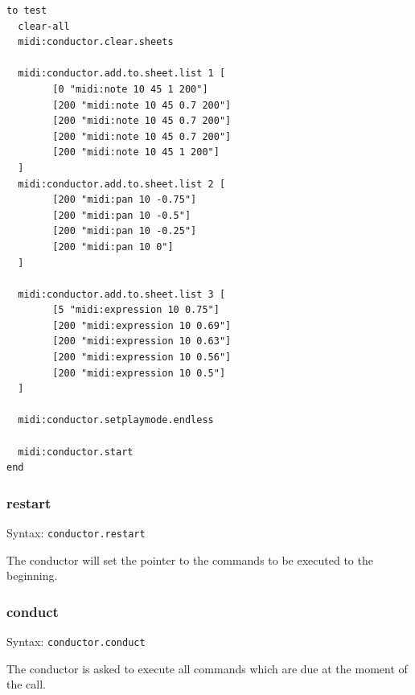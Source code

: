 \documentclass[10pt,a4paper]{article}
\begin{document}
\begin{lstlisting}[language=Logo]
to test
  clear-all
  midi:conductor.clear.sheets
 
  midi:conductor.add.to.sheet.list 1 [
		[0 "midi:note 10 45 1 200"]
		[200 "midi:note 10 45 0.7 200"]
		[200 "midi:note 10 45 0.7 200"]
		[200 "midi:note 10 45 0.7 200"]
		[200 "midi:note 10 45 1 200"]
  ]
  midi:conductor.add.to.sheet.list 2 [
		[200 "midi:pan 10 -0.75"]
		[200 "midi:pan 10 -0.5"]
		[200 "midi:pan 10 -0.25"]
		[200 "midi:pan 10 0"]
  ]
  
  midi:conductor.add.to.sheet.list 3 [
		[5 "midi:expression 10 0.75"]
		[200 "midi:expression 10 0.69"]
		[200 "midi:expression 10 0.63"]
		[200 "midi:expression 10 0.56"]
		[200 "midi:expression 10 0.5"]
  ]
  
  midi:conductor.setplaymode.endless

  midi:conductor.start
end
\end{lstlisting}

\subsubsection{restart}
Syntax: \lstinline|conductor.restart|

The conductor will set the pointer to the commands to be executed to the beginning. 
\subsubsection{conduct}
Syntax: \lstinline|conductor.conduct|

The conductor is asked to execute all commands which are due at the moment of the call.
\end{document}
